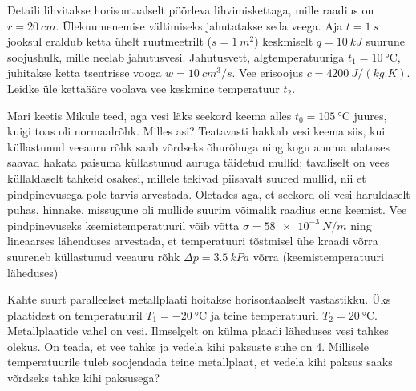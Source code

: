 \documentclass[10pt]{article}
\begin{document}
{%

Detaili lihvitakse horisontaalselt pöörleva lihvimiskettaga, mille raadius on $r = \SI{20}{cm}$. Ülekuumenemise vältimiseks jahutatakse seda veega. Aja $t = \SI{1}{s}$ jooksul eraldub ketta ühelt ruutmeetrilt ($s = \SI{1}{m^2}$) keskmiselt $q = \SI{10}{kJ}$ suurune soojushulk, mille neelab jahutusvesi. Jahutusvett, algtemperatuuriga $t_1 = \SI{10}{\degreeCelsius}$, juhitakse ketta tsentrisse vooga $w = \SI{10}{cm^3/s}$. Vee erisoojus $c = \SI{4200}{J/(kg.K)}$. Leidke üle kettaääre voolava vee keskmine temperatuur $t_2$.
\probend
\bigskip


Mari keetis Mikule teed, aga vesi läks seekord keema alles $t_0= \SI{105}{\degreeCelsius}$ juures, kuigi toas oli normaalrõhk. Milles asi? Teatavasti hakkab vesi keema siis, kui küllastunud veeauru rõhk saab võrdseks õhurõhuga ning kogu anuma ulatuses saavad hakata paisuma küllastunud auruga täidetud mullid; tavaliselt on vees küllaldaselt tahkeid osakesi, millele tekivad piisavalt suured mullid, nii et pindpinevusega pole tarvis arvestada. Oletades aga, et seekord oli vesi haruldaselt puhas, hinnake, missugune oli mullide suurim võimalik raadius enne keemist. Vee pindpinevuseks keemistemperatuuril võib võtta $\sigma = \SI{58e-3}{N/m}$ ning lineaarses lähenduses arvestada, et temperatuuri tõstmisel ühe kraadi võrra suureneb küllastunud veeauru rõhk $\Delta p = \SI{3,5}{kPa}$ võrra (keemistemperatuuri läheduses)
\probend
\bigskip


Kahte suurt paralleelset metallplaati hoitakse horisontaalselt vastastikku. Üks plaatidest on temperatuuril $T_1 = \SI{-20}{\degreeCelsius}$ ja teine temperatuuril $T_2 = \SI{20}{\degreeCelsius}$. Metallplaatide vahel on vesi. Ilmselgelt on külma plaadi läheduses vesi tahkes olekus. On teada, et vee tahke ja vedela kihi paksuste suhe on \num{4}. Millisele temperatuurile tuleb soojendada teine metallplaat, et vedela kihi paksus saaks võrdseks tahke kihi paksusega?
\probend
\bigskip


}
\end{document}
